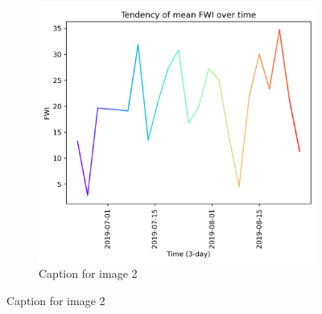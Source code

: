\begin{figure}[h]
\begin{subfigure}{0.49\textwidth}
		\includegraphics[width=\textwidth]{graphs/2019/tendency/2019_tendency_graph_FWI.png}
		\caption{Caption for image 2}
		\label{fig:img2}
	\end{subfigure}
	\label{fig:both_images}
\end{figure}

